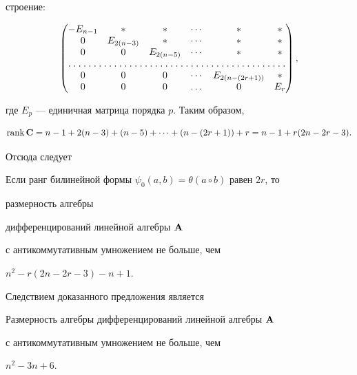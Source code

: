 строение: 


$$ 


\begin{pmatrix} 


-E_{n-1} & \ast & \ast & \dotsb & \ast & \ast \\ 


0 & E_{2(n-3)} & \ast & \dotsb & \ast & \ast \\ 


0 & 0 & E_{2(n-5)} & \dotsb & \ast & \ast \\ 


\hdotsfor[1.5]{6} \\ 


0 & 0 & 0 & \dotsb & E_{2(n-(2r+1))} & \ast \\ 


0 & 0 & 0 & \dotsc & 0 & E_r 


\end{pmatrix} 


, 


$$ 


где $E_p$ --- единичная матрица порядка $p$. Таким образом, 


$$ 


\rank \bold C=n-1+2(n-3)+(n-5)+\dotsb+ 


(n-(2r+1))+r=n-1+r(2n-2r-3). 


$$ 


 


Отсюда следует 


 


\begin{props} 


Если ранг билинейной формы $\psi_0(a,b)=\theta(a\circ b)$ равен $2r$, то 


размерность алгебры  


дифференцирований линейной алгебры $\bold A$  


с антикоммутативным умножением не больше, чем 


$n^2-r(2n-2r-3)-n+1$. 


\end{props} 


 


 


Следствием доказанного предложения является 


 


\begin{props} 


Размерность алгебры дифференцирований линейной алгебры $\bold A$ 


с антикоммутативным умножением не больше, чем 


$n^2-3n+6$. 


\end{props} 


